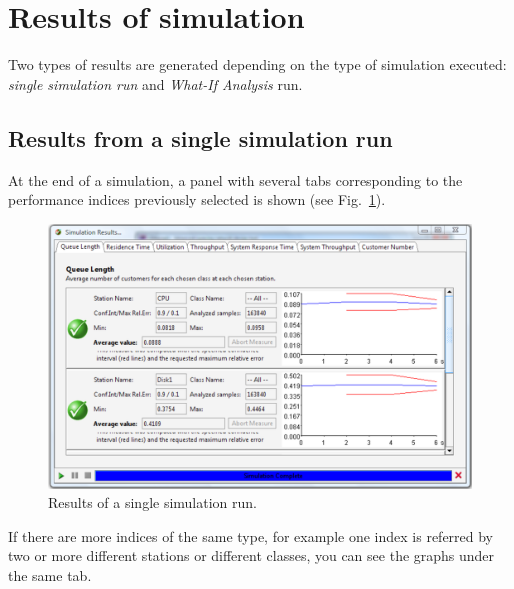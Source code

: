 \section{Results of simulation}
\label{ressults}

Two types of results are generated depending on the type of
simulation executed: \emph{single simulation run} and
\emph{What-If Analysis} run.

\subsection{Results from a single simulation run}
At the end of a simulation, a panel with several tabs
corresponding to the performance indices previously selected is
shown (see Fig.~\ref{fig:ssimrun}).\\
\begin{figure}[htb]
    \begin{center}
        \includegraphics[scale=.5]{img/jsimg/11.1.eps}
    \end{center}
    \caption{Results of a single simulation run.}
    \label{fig:ssimrun}
\end{figure}
If there are more indices of the same type, for example one index
is referred by two or more different stations or different classes,
you can see the graphs under the same tab.

